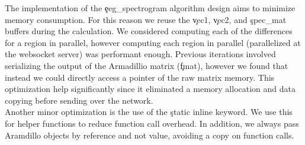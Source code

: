 The implementation of the \c{eeg\_spectrogram} algorithm design aims to
minimize memory consumption. For this reason we reuse the \c{vec1}, \c{vec2},
and \c{spec\_mat} buffers during the calculation. We considered computing each
of the differences for a region in parallel, however computing each region in
parallel (parallelized at the websocket server) was performant enough. Previous
iterations involved serializing the output of the Armadillio matrix (\c{fmat}),
however we found that instead we could directly access a pointer of the raw
matrix memory. This optimization help significantly since it eliminated a
memory allocation and data copying before sending over the network. \\

Another minor optimization is the use of the \c{static inline} keyword. We use
this for helper functions to reduce function call overhead. In addition, we
always pass Aramdillo objects by reference and not value, avoiding a copy on
function calls.

